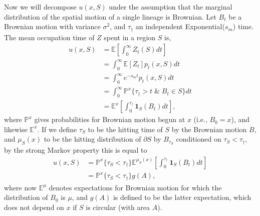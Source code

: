 \documentclass[10pt,letterpaper]{article}
\renewcommand{\P}{\mathbb{P}}
\newcommand{\E}{\mathbb{E}}
\newcommand{\one}{\mathbf{1}}
\begin{document}
Now we will decompose $u(x,S)$ under the assumption that 
the marginal distribution of the spatial motion of a single lineage is Brownian.
Let $B_t$ be a Brownian motion with variance $\sigma^2$, 
and $\tau_\dagger$ an independent Exponential($s_m$) time.
The mean occupation time of $Z$ spent in a region $S$ is,
\begin{align}
    u(x,S) &= \E\left[\int_0^\infty Z_t(S) dt \right] \\
           &= \int_0^\infty \E[Z_t] p_t(x,S) dt \\
        &= \int_0^\infty e^{-s_m t} p_t(x,S) dt \\
        &= \int_0^\infty \P^x\{ \tau_\dagger > t \; \& \; B_t \in S \} dt \\
        &= \E^x\left[ \int_0^{\tau_\dagger} \one_S(B_t) dt \right]  ,
\end{align}
where $\P^x$ gives probabilities for Brownian motion begun at $x$ (i.e., $B_0=x$),
and likewise $\E^x$.
If we define
$\tau_S$ to be the hitting time of $S$ by the Brownian motion $B$,
and $\mu_S(x)$ to be the hitting distribution of $\partial S$ by $B_{\tau_S}$ conditioned on $\tau_S < \tau_\dagger$,
by the strong Markov property this is equal to
\begin{align}
    u(x,S) %
           &= \P^x\{ \tau_S < \tau_\dagger \}  \E^{\mu_S(x)}\left[ \int_0^{\tau_\dagger} \one_S(B_t) dt \right] \\
           &= \P^x\{ \tau_S < \tau_\dagger \}  g(A)  ,
\end{align}
where now $\E^\mu$ denotes expectations for Brownian motion for which the distribution of $B_0$ is $\mu$, 
and $g(A)$ is defined to be the latter expectation,
which does not depend on $x$ if $S$ is circular (with area $A$).
\end{document}
